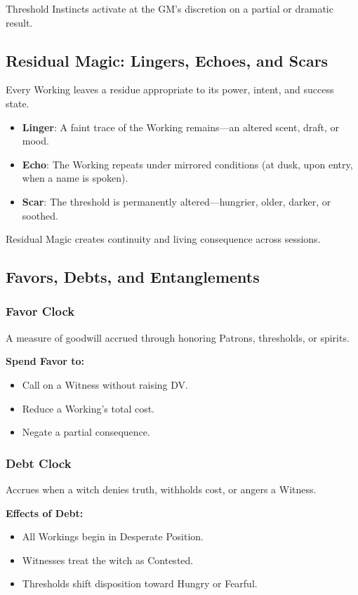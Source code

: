 \documentclass[11pt]{book}
\begin{document}
Threshold Instincts activate at the GM's discretion on a partial or dramatic result.


\subsection*{Residual Magic: Lingers, Echoes, and Scars}

Every Working leaves a residue appropriate to its power, intent, and success state.

\begin{itemize}[noitemsep]
    \item \textbf{Linger}: A faint trace of the Working remains---an altered scent, draft, or mood.
    \item \textbf{Echo}: The Working repeats under mirrored conditions (at dusk, upon entry, when a name is spoken).
    \item \textbf{Scar}: The threshold is permanently altered---hungrier, older, darker, or soothed.
\end{itemize}

Residual Magic creates continuity and living consequence across sessions.


\subsection*{Favors, Debts, and Entanglements}

\subsubsection*{Favor Clock}
A measure of goodwill accrued through honoring Patrons, thresholds, or spirits.

\textbf{Spend Favor to:}
\begin{itemize}[noitemsep]
    \item Call on a Witness without raising DV.
    \item Reduce a Working's total cost.
    \item Negate a partial consequence.
\end{itemize}

\subsubsection*{Debt Clock}
Accrues when a witch denies truth, withholds cost, or angers a Witness.

\textbf{Effects of Debt:}
\begin{itemize}[noitemsep]
    \item All Workings begin in Desperate Position.
    \item Witnesses treat the witch as Contested.
    \item Thresholds shift disposition toward Hungry or Fearful.
\end{itemize}
\end{document}
